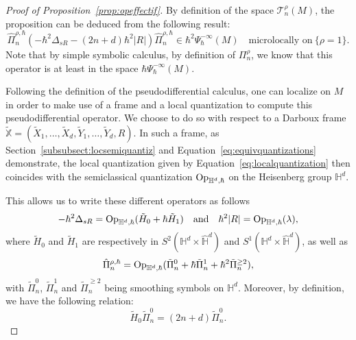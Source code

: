 \documentclass[12pt,a4paper]{amsart}
\theoremstyle{plain}
\theoremstyle{definition}
\theoremstyle{remark}
\numberwithin{equation}{section}
\theoremstyle{definition}
\def \Op{{\rm Op}}
\def \bX{\mathbb{X}}
\def \Heis{\mathbb{H}}
\def \Hhat{\widehat{\Heis}}
\numberwithin{equation}{section}
\begin{document}
\begin{proof}[Proof of Proposition~\ref{prop:opeffectif}]
    By definition of the space $\mathscr{T}_n^\rho(M)$, the proposition can be deduced from the following result:
    \begin{equation}
        \label{eq:noorder1}
        \hat{\Pi}_n^{\rho,\hbar}\left(-\hbar^2\Delta_{sR} - (2n+d)\hbar^2|R|\right)\hat{\Pi}_n^{\rho,\hbar} \in \hbar^2\Psi_\hbar^{-\infty}(M)\quad\mbox{microlocally on}\ \{\rho=1\}.
    \end{equation}
    Note that by simple symbolic calculus, by definition of $\Pi_n^\rho$, we know that this operator is at least in the space $\hbar\Psi_\hbar^{-\infty}(M)$.
    
    Following the definition of the pseudodifferential calculus, one can localize on $M$ in order to make use of a frame and a local quantization to compute this pseudodifferential operator. We choose to do so with respect to a Darboux frame $\tilde{\bX} = (\tilde{X}_1,\dots,\tilde{X}_d,\tilde{Y}_1,\dots,\tilde{Y}_d,R)$. In such a frame, as Section~\ref{subsubsect:locsemiquantiz} and Equation~\eqref{eq:equivquantizations} demonstrate, the local quantization given by Equation~\eqref{eq:localquantization} then coincides with the semiclassical quantization $\Op_{\Heis^d,\hbar}$ on the Heisenberg group $\Heis^d$.

    This allows us to write these different operators as follows 
    \begin{equation*}
        -\hbar^2 \Delta_{sR} = \Op_{\Heis^d,\hbar}(\tilde{H}_0 + \hbar \tilde{H}_1) \quad\mbox{and}\quad \hbar^2|R| = \Op_{\Heis^d,\hbar}(\lambda),
    \end{equation*}
    where $\tilde{H}_0$ and $\tilde{H}_1$ are respectively in $S^2(\Heis^d\times\Hhat^d)$ and $S^1(\Heis^d\times\Hhat^d)$, as well as
    \begin{equation*}
        \hat{\Pi}_n^{\rho,\hbar} = \Op_{\Heis^d,\hbar}(\tilde{\Pi}_n^0 + \hbar\tilde{\Pi}_n^1+\hbar^2 \tilde{\Pi}_n^{\geq2}),
    \end{equation*}
    with $\tilde{\Pi}_n^0$, $\tilde{\Pi}_n^1$ and $\tilde{\Pi}_n^{\geq2}$ being smoothing symbols on $\Heis^d$. Moreover, by definition, we have the following relation:
    \begin{equation*}
        \tilde{H}_0 \tilde{\Pi}_n^0 = (2n+d)\tilde{\Pi}_n^0.
    \end{equation*}


\end{proof}
\end{document}
